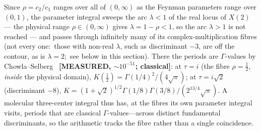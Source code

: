 \documentclass[aps,pra,twocolumn,superscriptaddress,longbibliography]{revtex4-2}
\begin{document}
Since $\rho=c_{2}/c_{1}$ ranges over all of $(0,\infty)$ as the Feynman
parameters range over $(0,1)$, the parameter integral sweeps the arc
$\lambda<1$ of the real locus of $X(2)$ --- the physical range
$\rho\in(0,\infty)$ gives $\lambda=1-\rho<1$, so the arc $\lambda>1$ is not
reached --- and passes through infinitely many of its
complex-multiplication fibres (not every one:\ those with non-real $\lambda$,
such as discriminant $-3$, are off the contour, as is $\lambda=2$;\ see
below in this section).  There the
periods are $\Gamma$-values by Chowla--Selberg~\cite{chowla_selberg1967} \textbf{[MEASURED, $\sim\!10^{-51}$;
classical]}: at $\tau=i$ (the fibre $\rho=\tfrac12$, \emph{inside} the physical
domain), $K(\tfrac12)=\Gamma(1/4)^{2}/(4\sqrt\pi)$; at $\tau=i\sqrt2$
(discriminant $-8$), $K=(1+\sqrt2)^{1/2}\Gamma(1/8)\Gamma(3/8)/(2^{13/4}\sqrt\pi)$.
A molecular three-center integral thus has, at the fibres its own parameter
integral visits, periods that are classical $\Gamma$-values---across distinct
fundamental discriminants, so the arithmetic tracks the fibre rather than a single
coincidence.
\end{document}
